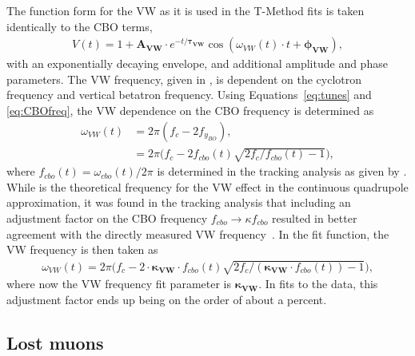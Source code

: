 The function form for the VW as it is used in the T-Method fits is taken identically to the CBO terms, 
    \begin{align} \label{eq:VWterm}
        V(t) = 1 + \boldsymbol{A_{VW}} \cdot e^{-t/\boldsymbol{\tau_{VW}}} \cos(\omega_{VW}(t) \cdot t + \boldsymbol{\phi_{VW}}), 
    \end{align}
with an exponentially decaying envelope, and additional amplitude and phase parameters. The VW frequency, given in , is dependent on the cyclotron frequency and vertical betatron frequency. Using Equations~\ref{eq:tunes} and \ref{eq:CBOfreq}, the VW dependence on the CBO frequency is determined as
    \begin{equation}
    \begin{aligned}
        \omega_{VW}(t) &= 2\pi (f_{c} - 2f_{y_{BO}}), \\
                    &= 2\pi \Big(f_{c} - 2f_{cbo}(t)\sqrt{2f_{c}/f_{cbo}(t)-1}\Big),
    \label{eq:VWfreqOne}
    \end{aligned}
    \end{equation}
where $f_{cbo}(t) = \omega_{cbo}(t)/2\pi$ is determined in the tracking analysis as given by . While  is the theoretical frequency for the VW effect in the continuous quadrupole approximation, it was found in the tracking analysis that including an adjustment factor on the CBO frequency $f_{cbo} \rightarrow \kappa f_{cbo}$ resulted in better agreement with the directly measured VW frequency~\cite{cbofrequency,verticalbetatron}. In the fit function, the VW frequency is then taken as
    \begin{align} \label{eq:VWfreqKappa}
        \omega_{VW}(t) = 2\pi \Big(f_{c} - 2 \cdot \boldsymbol{\kappa_{VW}} \cdot f_{cbo}(t)\sqrt{2f_{c}/(\boldsymbol{\kappa_{VW}} \cdot f_{cbo}(t))-1}\Big),
    \end{align}
where now the VW frequency fit parameter is $\boldsymbol{\kappa_{VW}}$. In fits to the data, this adjustment factor ends up being on the order of about a percent.




\subsection{Lost muons}
\label{subsec:lostmuons}



